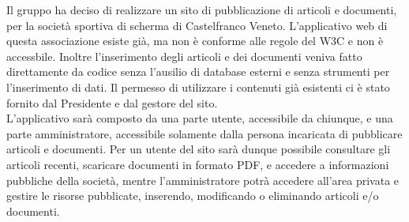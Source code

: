 Il gruppo ha deciso di realizzare un sito di pubblicazione di articoli e documenti, per la societ\`a sportiva di scherma di Castelfranco Veneto. L'applicativo web di questa associazione esiste gi\`a, ma non \`e conforme alle regole del W3C e non \`e accessbile. Inoltre l'inserimento degli articoli e dei documenti veniva fatto direttamente da codice senza l'ausilio di database esterni e senza strumenti per l'inserimento di dati.
Il permesso di utilizzare i contenuti gi\`a esistenti ci \`e stato fornito dal Presidente e dal gestore del sito.
\\L'applicativo sar\`a composto da una parte utente, accessibile da chiunque, e una parte amministratore, accessibile solamente dalla persona incaricata di pubblicare articoli e documenti. 
Per un utente del sito sar\`a dunque possibile consultare gli articoli recenti, scaricare documenti in formato PDF, e accedere a informazioni pubbliche della societ\`a, mentre l'amministratore potr\`a accedere all'area privata e gestire le risorse pubblicate, inserendo, modificando o eliminando articoli e/o documenti.\\

